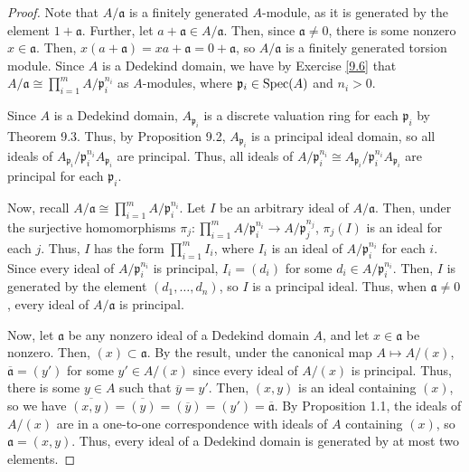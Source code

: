 \begin{proof}
Note that $A/\mathfrak{a}$ is a finitely generated $A$-module, as it is generated by the element $1 + \mathfrak{a}$. Further, let
$a + \mathfrak{a} \in A/\mathfrak{a}$. Then, since $\mathfrak{a} \neq 0$, there is some nonzero $x \in \mathfrak{a}$. Then,
$x(a + \mathfrak{a}) = xa + \mathfrak{a} = 0 + \mathfrak{a}$, so $A/\mathfrak{a}$ is a finitely generated torsion module. Since
$A$ is a Dedekind domain, we have by Exercise \ref{9.6} that $A/\mathfrak{a} \cong \prod_{i=1}^m A/\mathfrak{p}_i^{n_i}$ as
$A$-modules, where $\mathfrak{p}_i \in \operatorname{Spec}(A)$ and $n_i > 0$.

Since $A$ is a Dedekind domain, $A_{\mathfrak{p}_i}$ is a discrete valuation ring for each $\mathfrak{p}_i$ by Theorem 9.3. Thus, 
by Proposition 9.2, $A_{\mathfrak{p}_i}$ is a principal ideal domain, so all ideals of $A_{\mathfrak{p}_i}/\mathfrak{p}_i^{n_i}A_{\mathfrak{p}_i}$ 
are principal. Thus, all ideals of $A/\mathfrak{p}_i^{n_i} \cong A_{\mathfrak{p}_i}/\mathfrak{p}_i^{n_i}A_{\mathfrak{p}_i}$ are principal 
for each $\mathfrak{p}_i$.

Now, recall $A/\mathfrak{a} \cong \prod_{i=1}^m A/\mathfrak{p}_i^{n_i}$. Let $I$ be an arbitrary ideal of $A/\mathfrak{a}$. Then, under the 
surjective homomorphisms $\pi_j : \prod_{i=1}^m A/\mathfrak{p}_i^{n_i} \to A/\mathfrak{p}_j^{n_j}$, $\pi_j(I)$ is an ideal for each $j$. Thus, 
$I$ has the form $\prod_{i=1}^m I_i$, where $I_i$ is an ideal of $A/\mathfrak{p}_i^{n_i}$ for each $i$. Since every ideal of $A/\mathfrak{p}_i^{n_i}$ 
is principal, $I_i = (d_i)$ for some $d_i \in A/\mathfrak{p}_i^{n_i}$. Then, $I$ is generated by the element $(d_1,\ldots,d_n)$, so $I$ is a principal 
ideal. Thus, when $\mathfrak{a} \neq 0$, every ideal of $A/\mathfrak{a}$ is principal.

Now, let $\mathfrak{a}$ be any nonzero ideal of a Dedekind domain $A$, and let $x \in \mathfrak{a}$ be nonzero. Then, $(x) \subset \mathfrak{a}$.
By the result, under the canonical map $A \mapsto A/(x)$, $\overline{\mathfrak{a}} = (y')$ for some $y' \in A/(x)$ since every ideal of $A/(x)$ is
principal. Thus, there is some $y \in A$ such that $\overline{y} = y'$. Then, $(x,y)$ is an ideal containing $(x)$, so we have 
$\overline{(x,y)} = \overline{(y)} = (\overline{y}) = (y') = \overline{\mathfrak{a}}$. By Proposition 1.1, the ideals of $A/(x)$ are in a one-to-one 
correspondence with ideals of $A$ containing $(x)$, so $\mathfrak{a} = (x,y)$. Thus, every ideal of a Dedekind domain is generated by at most two elements.
\end{proof}

